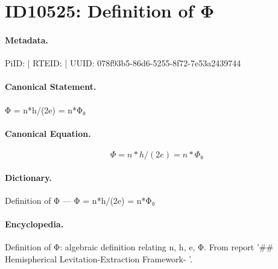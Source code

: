 \section*{ID10525: Definition of Φ}
\paragraph{Metadata.}
PiID:  | RTEID:  | UUID: 078f93b5-86d6-5255-8f72-7e53a2439744

\paragraph{Canonical Statement.}
Φ = n*h/(2e) = n*Φ₀

\paragraph{Canonical Equation.}
\[
Φ = n*h/(2e) = n*Φ₀
\]

\paragraph{Dictionary.}
Definition of Φ — Φ = n*h/(2e) = n*Φ₀

\paragraph{Encyclopedia.}
Definition of Φ: algebraic definition relating n, h, e, Φ. From report '\#\# Hemispherical Levitation-Extraction Framework- '.
